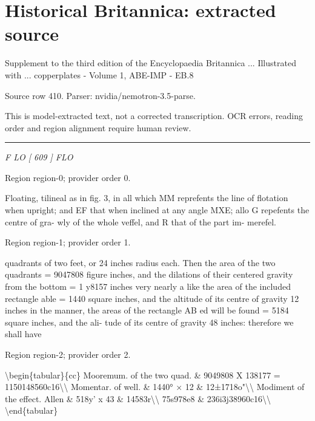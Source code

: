 \documentclass[11pt]{article}
\begin{document}
\section*{Historical Britannica: extracted source}
Supplement to the third edition of the Encyclopaedia Britannica ... Illustrated with ... copperplates - Volume 1, ABE-IMP - EB.8\par
{\small Source row 410. Parser: nvidia/nemotron-3.5-parse.\par}
{\small This is model-extracted text, not a corrected transcription. OCR errors, reading order and region alignment require human review.\par}
\hrule\medskip
{\small\itshape F LO [ 609 ] FLO\par}

{\scriptsize\color{gray} Region region-0; provider order 0.\par}
\medskip

Floating, tilineal as in fig. 3, in all which MM reprefents the line of flotation when upright; and EF that when inclined at any angle MXE; allo G repefents the centre of gra- wly of the whole veffel, and R that of the part im- merefel.
\par

{\scriptsize\color{gray} Region region-1; provider order 1.\par}
\medskip

quadrants of two feet, or 24 inches radius each. Then the area of the two quadrants = 9047808 figure inches, and the dilations of their centered gravity from the bottom = 1 y8157 inches very nearly a like the area of the included rectangle able = 1440 square inches, and the altitude of its centre of gravity 12 inches in the manner, the areas of the rectangle AB ed will be found = 5184 square inches, and the ali- tude of its centre of gravity 48 inches: therefore we shall have
\par

{\scriptsize\color{gray} Region region-2; provider order 2.\par}
\medskip

\textbackslash{}begin\{tabular\}\{cc\}
Mooremum. of the two quad. \& 9049808 X 138177 = 1150148560c16\textbackslash{}\textbackslash{}
Momentar. of well. \& 1440° × 12 \& 12±1718o"\textbackslash{}\textbackslash{}
Modiment of the effect. Allen \& 518y' x 43 \& 14583r\textbackslash{}\textbackslash{}
75s978e8 \& 236i3j38960c16\textbackslash{}\textbackslash{}
\textbackslash{}end\{tabular\}
\par
\end{document}
